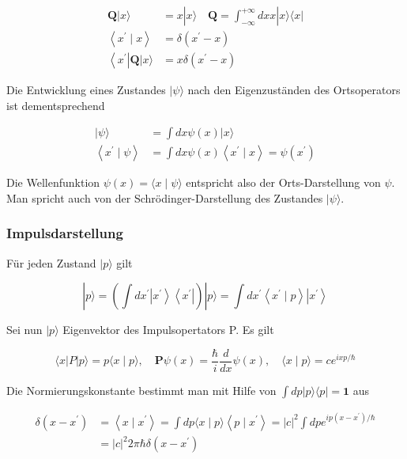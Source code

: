 \documentclass[10pt, letterpaper]{article}
\begin{document}
$$
\begin{aligned}
\mathbf{Q}|x\rangle & =x|x\rangle \quad \mathbf{Q}=\int_{-\infty}^{+\infty} d x x|x\rangle\langle x| \\
\left\langle x^{\prime} \mid x\right\rangle & =\delta\left(x^{\prime}-x\right) \\
\left\langle x^{\prime}\right| \mathbf{Q}|x\rangle & =x \delta\left(x^{\prime}-x\right)
\end{aligned}
$$

Die Entwicklung eines Zustandes $|\psi\rangle$ nach den Eigenzuständen des Ortsoperators ist dementsprechend

$$
\begin{aligned}
|\psi\rangle & =\int d x \psi(x)|x\rangle \\
\left\langle x^{\prime} \mid \psi\right\rangle & =\int d x \psi(x)\left\langle x^{\prime} \mid x\right\rangle=\psi\left(x^{\prime}\right)
\end{aligned}
$$

Die Wellenfunktion $\psi(x)=\langle x \mid \psi\rangle$ entspricht also der Orts-Darstellung von $\psi$. Man spricht auch von der Schrödinger-Darstellung des Zustandes $|\psi\rangle$.

\subsubsection*{Impulsdarstellung}
Für jeden Zustand $|p\rangle$ gilt

$$
|p\rangle=\left(\int d x^{\prime}\left|x^{\prime}\right\rangle\left\langle x^{\prime}\right|\right)|p\rangle=\int d x^{\prime}\left\langle x^{\prime} \mid p\right\rangle\left|x^{\prime}\right\rangle
$$

Sei nun $|p\rangle$ Eigenvektor des Impulsopertators P. Es gilt

$$
\langle x| P|p\rangle=p\langle x \mid p\rangle, \quad \mathbf{P} \psi(x)=\frac{\hbar}{i} \frac{d}{d x} \psi(x), \quad\langle x \mid p\rangle=c e^{i x p / \hbar}
$$

Die Normierungskonstante bestimmt man mit Hilfe von $\int d p|p\rangle\langle p|=\mathbf{1}$ aus

$$
\begin{aligned}
\delta\left(x-x^{\prime}\right) & =\left\langle x \mid x^{\prime}\right\rangle=\int d p\langle x \mid p\rangle\left\langle p \mid x^{\prime}\right\rangle=|c|^{2} \int d p e^{i p\left(x-x^{\prime}\right) / \hbar} \\
& =|c|^{2} 2 \pi \hbar \delta\left(x-x^{\prime}\right)
\end{aligned}
$$
\end{document}

